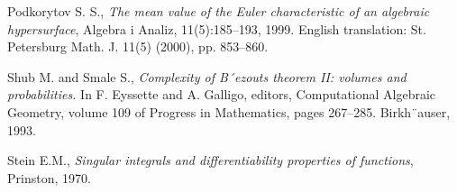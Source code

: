 \documentclass[10pt]{amsart}
\theoremstyle{remark}
\begin{document}
\begin{thebibliography}{9999}
Podkorytov S. S., {\it The mean value of the Euler characteristic
of an algebraic hypersurface}, Algebra i Analiz, 11(5):185--193,
1999. English translation: St. Petersburg Math. J. 11(5) (2000),
pp. 853--860.

Shub M. and Smale S., {\it  Complexity of B´ezouts theorem II:
volumes and probabilities.} In F. Eyssette and A. Galligo,
editors, Computational Algebraic Geometry, volume 109 of Progress
in Mathematics, pages 267--285. Birkh¨auser, 1993.

Stein E.M., {\it  Singular integrals and differentiability
properties of functions}, Prinston, 1970.

\end{thebibliography}
\end{document}
